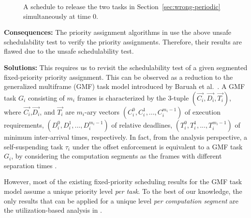 \begin{figure}[t]
\begin{center}

\end{center}
\caption{A schedule to release the two tasks in Section~\ref{sec:wrong-periodic} simultaneously at time $0$.}
\label{fig:counterexample-FP-segment-level}
\end{figure}

{\bf Consequences:} The priority assignment algorithms in \cite{RTSS-KimANR13,DBLP:journals/ieicet/DingTT09} use the above unsafe schedulability test to verify the priority assignments. Therefore, their results are flawed due to the unsafe schedulability test.

{\bf Solutions:} This requires us to revisit the schedulability test of a given segmented fixed-priority priority assignment. This can be observed as a reduction to 
the generalized multiframe (GMF) task model introduced by Baruah et al.~\cite{baruah1999generalized}. A GMF task $G_i$ consisting of $m_i$ frames is characterized by the $3$-tuple $(\vec{C_i},\vec{D_i},\vec{T_i})$, where $\vec{C_i}$,$\vec{D_i}$, and $\vec{T_i}$ are $m_i$-ary vectors $(C_{i}^0,C_{i}^1,...,C_{i}^{m_i-1})$ of execution requirements, $(D_{i}^0,D_{i}^1,...,D_{i}^{m_i-1})$ of relative deadlines, $(T_{i}^0,T_{i}^1,...,T_{i}^{m_i-1})$ of minimum inter-arrival times, respectively.
In fact, from the analysis perspective, a self-suspending task $\tau_i$ under the offset enforcement is equivalent to a GMF task $G_i$,  by considering the computation segments as the frames with different separation times \cite{WC16-suspend-DATE,DBLP:journals/ieicet/DingTT09}.

However, most of the existing fixed-priority scheduling results for the GMF task model assume a unique priority level \emph{per task}. To the best of our knowledge, the only results that can be applied for a unique level \emph{per computation segment} are the utilization-based analysis in \cite{DBLP:journals/corr/ChenHL15b,huang2015mode}. 





